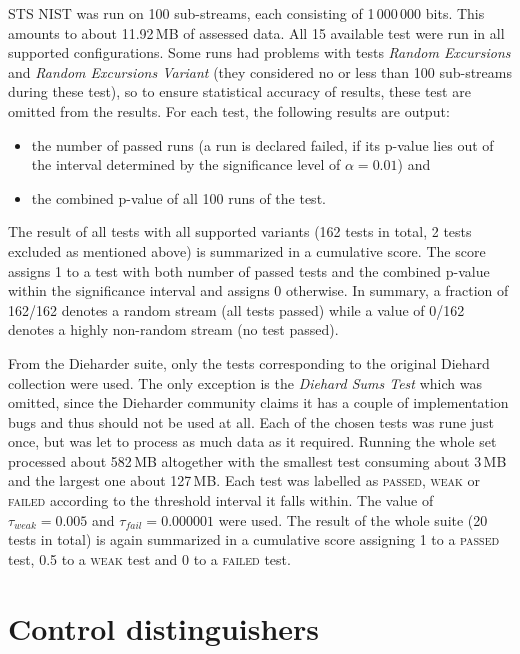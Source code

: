 \documentclass[12pt,twoside]{fithesis2}		%
\renewcommand{\_}{\leavevmode \kern0.0em\vbox{\hrule width0.4em}}
\newcommand{\squarebullet}{\textcolor{black}{\raisebox{0.15em}{\rule{4pt}{4pt}}}}
\newenvironment{myItemize}{
  \begin{itemize}[leftmargin=2em,rightmargin=1em,itemsep=\parskip ,parsep=0em,topsep=0em,partopsep=0em]
  \renewcommand{\labelitemi}{\squarebullet}
  \renewcommand{\labelitemii}{$\diamond$}
}{
  \end{itemize}
}
\begin{document}
STS NIST was run on 100 sub-streams, each consisting of 1\,000\,000 bits. This amounts to about 11.92\,MB of assessed data.
All 15 available test were run in all supported configurations. Some runs had problems with tests \textit{Random Excursions} 
and \textit{Random Excursions Variant} (they considered no or less than 100 sub-streams during these test), 
so to ensure statistical accuracy of results, these test are omitted from the results.
For each test, the following results are output:
\begin{myItemize}
\item the number of passed runs (a run is declared failed, if its p-value lies out of the interval determined by the significance
level of $\alpha = 0.01$) and
\item the combined p-value of all 100 runs of the test.
\end{myItemize}
The result of all tests with all supported variants (162 tests in total, 2 tests excluded as mentioned above) 
is summarized in a cumulative score. The score assigns 1 to a test with both number of passed tests and the
combined p-value within the significance interval and assigns 0 otherwise. 
In summary, a fraction of 162/162 denotes a random stream (all tests passed) while a value of 0/162 denotes a highly non-random
stream (no test passed).

From the Dieharder suite, only the tests corresponding to the original Diehard collection were used.
The only exception is the \textit{Diehard Sums Test} which was omitted, since the Dieharder community claims it has a couple of
implementation bugs and thus should not be used at all. Each of the chosen tests was rune just once, but was let
to process as much data as it required. Running the whole set processed about 582\,MB altogether with the smallest test
consuming about 3\,MB and the largest one about 127\,MB. Each test was labelled as \textsc{passed}, \textsc{weak} or \textsc{failed}
according to the threshold interval it falls within. The value of $\tau_{weak} = 0.005$ and $\tau_{fail} = 0.000001$ were used.
The result of the whole suite (20 tests in total) is again summarized in a cumulative score assigning 1 to a \textsc{passed} test,
0.5 to a \textsc{weak} test and 0 to a \textsc{failed} test.

\chapter{Control distinguishers}
\label{chap:distinguish-control}
\end{document}
